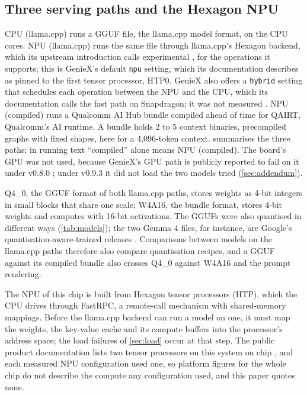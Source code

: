 \documentclass[11pt]{article}
\begin{document}
\subsection{Three serving paths and the Hexagon NPU}\label{sec:paths}

CPU (llama.cpp) runs a GGUF file, the llama.cpp model format, on the CPU cores. NPU (llama.cpp) runs the same file through llama.cpp's Hexagon backend, which its upstream introduction calls experimental \citep{llamacppPR16547}, for the operations it supports; this is GenieX's default \texttt{npu} setting, which its documentation describes as pinned to the first tensor processor, HTP0. GenieX also offers a \texttt{hybrid} setting that schedules each operation between the NPU and the CPU, which its documentation calls the fast path on Snapdragon; it was not measured \citep{geniex2026}. NPU (compiled) runs a Qualcomm AI Hub bundle compiled ahead of time for QAIRT, Qualcomm's AI runtime. A bundle holds 2 to 5 context binaries, precompiled graphs with fixed shapes, here for a 4,096-token context.  summarises the three paths; in running text ``compiled'' alone means NPU (compiled). The board's GPU was not used, because GenieX's GPU path is publicly reported to fail on it under v0.8.0 \citep{geniexPR1538}; under v0.9.3 it did not load the two models tried (\cref{sec:addendum}).

Q4\_0, the GGUF format of both llama.cpp paths, stores weights as 4-bit integers in small blocks that share one scale; W4A16, the bundle format, stores 4-bit weights and computes with 16-bit activations. The GGUFs were also quantised in different ways (\cref{tab:models}); the two Gemma 4 files, for instance, are Google's quantisation-aware-trained releases \citep{gemma4}. Comparisons between models on the llama.cpp paths therefore also compare quantisation recipes, and a GGUF against its compiled bundle also crosses Q4\_0 against W4A16 and the prompt rendering.

The NPU of this chip is built from Hexagon tensor processors (HTP), which the CPU drives through FastRPC, a remote-call mechanism with shared-memory mappings. Before the llama.cpp backend can run a model on one, it must map the weights, the key-value cache and its compute buffers into the processor's address space; the load failures of \cref{sec:load} occur at that step. The public product documentation lists two tensor processors on this system on chip \citep{qcomIQ9brief,qcomDeviceDesc}, and each measured NPU configuration used one, so platform figures for the whole chip do not describe the compute any configuration used, and this paper quotes none.
\end{document}
